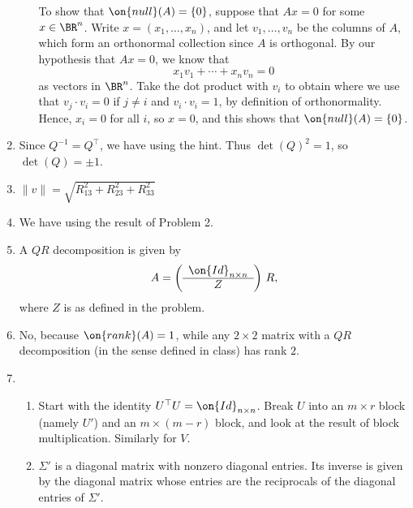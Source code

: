 \documentclass[10pt]{amsart}
\theoremstyle{mythm}
\theoremstyle{definition}
\theoremstyle{myrmk}
\begin{document}
\begin{enumerate}[label=\arabic*.]
\begin{enumerate}[label=(\arabic*)]
			To show that $\on{null}(A) = \{0\}$, suppose that $Ax = 0$ for some $x \in \BR^n$. Write $x = (x_1, \ldots, x_n)$, and let $v_1, \ldots, v_n$ be the columns of $A$, which form an orthonormal collection since $A$ is orthogonal. By our hypothesis that $Ax = 0$, we know that
			\[
				x_1v_1 + \cdots + x_n v_n = 0
			\]
			as vectors in $\BR^n$. Take the dot product with $v_i$ to obtain 
			where we use that $v_j \cdot v_i = 0$ if $j \neq i$ and $v_i \cdot v_i = 1$, by definition of orthonormality. Hence, $x_i = 0$ for all $i$, so $x = 0$, and this shows that $\on{null}(A) = \{0\}$. 
		\end{enumerate}
		\item Since $Q^{-1} = Q^\top$, we have 
		using the hint. Thus $\det(Q)^2 = 1$, so $\det(Q) = \pm 1$. 
		\item $\lVert v \rVert = \sqrt{R_{13}^2 + R_{23}^2 + R_{33}^2}$ 
		\item We have 
		using the result of Problem 2. 
		\item A $QR$ decomposition is given by 
		\[
			A = \left( \begin{array}{cc} \on{Id}_{n \times n} \\ \hline Z \end{array} \right) \, R, 
		\]
		where $Z$ is as defined in the problem. 
		\item No, because $\on{rank}(A) = 1$, while any $2 \times 2$ matrix with a $QR$ decomposition (in the sense defined in class) has rank $2$. 
		\item \begin{enumerate}[label=(\arabic*)]
			\item Start with the identity $U^\top U = \on{Id}_{n \times n}$. Break $U$ into an $m \times r$ block (namely $U'$) and an $m \times (m-r)$ block, and look at the result of block multiplication. Similarly for $V$.  
			\item $\Sigma'$ is a diagonal matrix with nonzero diagonal entries. Its inverse is given by the diagonal matrix whose entries are the reciprocals of the diagonal entries of $\Sigma'$. 

\end{enumerate}
\end{enumerate}
\end{document}
